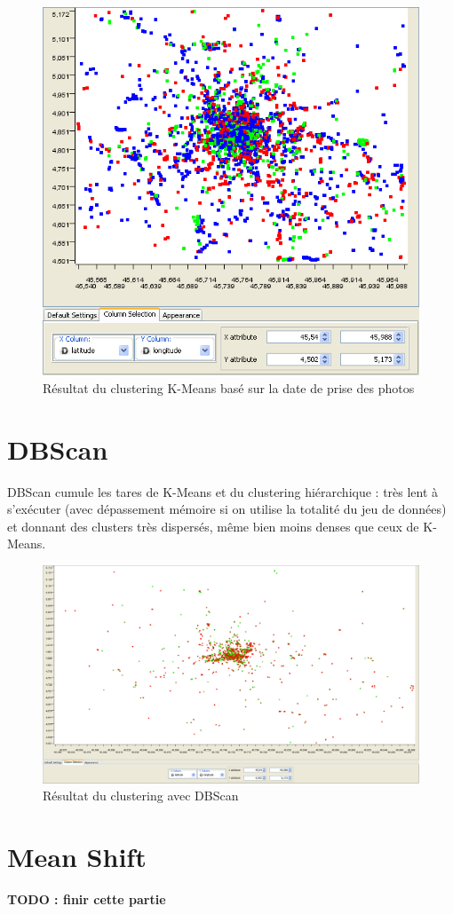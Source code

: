    \begin{figure}[H]
        \centering
        \includegraphics[scale=0.28]{../screenshots/kmeans_month.png}
        \caption{Résultat du clustering K-Means basé sur la date de prise des photos}
        \label{diagram:kmeans_month}
    \end{figure}


\section{DBScan}
    DBScan cumule les tares de K-Means et du clustering hiérarchique : très lent à s’exécuter (avec dépassement mémoire
    si on utilise la totalité du jeu de données) et donnant des clusters très dispersés, même bien moins denses que ceux de K-Means.


    \begin{figure}[H]
        \centering
        \includegraphics[scale=0.3]{../screenshots/dbscan_geographic.png}
        \caption{Résultat du clustering avec DBScan}
        \label{diagram:dbscan_geographic}
    \end{figure}


\section{Mean Shift}

    \textbf{TODO : finir cette partie}